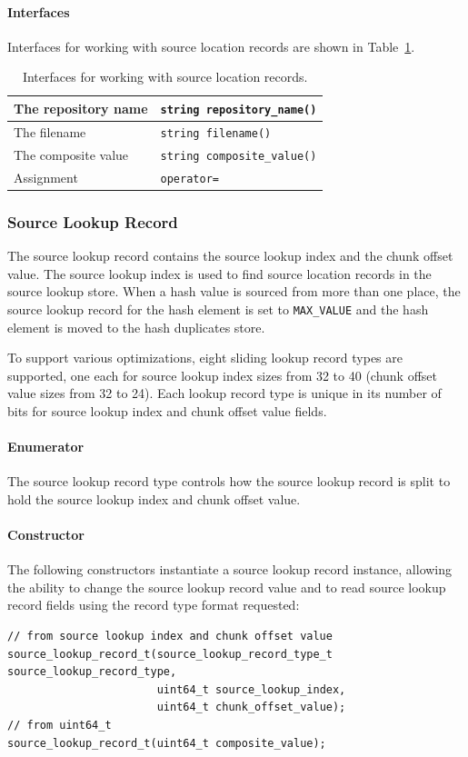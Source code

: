 \documentclass[10pt,twoside]{article}
\begin{document}
\paragraph{Interfaces}
Interfaces for working with source location records
are shown in Table~\ref{source-location-interfaces}.
\begin{table}[h]
\center
\begin{tabular}{|p{2in}|p{4in}|}
\hline
The repository name & \texttt{string repository\_name()} \\
\hline
The filename & \texttt{string filename()} \\
\hline
The composite value & \texttt{string composite\_value()} \\
\hline
Assignment & \texttt{operator=} \\
\hline
\end{tabular}
\caption{Interfaces for working with source location records.\label{source-location-interfaces}}
\end{table}

\subsubsection{Source Lookup Record\label{source-lookup-record}}
The source lookup record contains the source lookup index and the chunk offset value.
The source lookup index is used to find source location records in the source lookup store.
When a hash value is sourced from more than one place,
the source lookup record for the hash element is set to \texttt{MAX\_VALUE}
and the hash element is moved to the hash duplicates store.

To support various optimizations,
eight sliding lookup record types are supported,
one each for source lookup index sizes from 32 to 40
(chunk offset value sizes from 32 to 24).
Each lookup record type is unique in its number of bits
for source lookup index and chunk offset value fields.

\paragraph{Enumerator}
The source lookup record type controls how the source lookup record
is split to hold the source lookup index and chunk offset value.

\paragraph{Constructor}
The following constructors instantiate a source lookup record instance,
allowing the ability to change the source lookup record value
and to read source lookup record fields using the record type format requested:
\begin{small}
\begin{verbatim}
// from source lookup index and chunk offset value
source_lookup_record_t(source_lookup_record_type_t source_lookup_record_type,
                       uint64_t source_lookup_index,
                       uint64_t chunk_offset_value);
// from uint64_t
source_lookup_record_t(uint64_t composite_value);
\end{verbatim}
\end{small}
\end{document}
